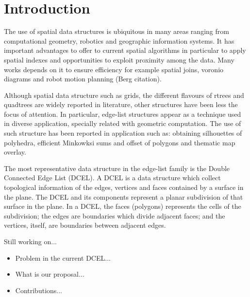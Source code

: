 \section{Introduction}
The use of spatial data structures is ubiquitous in many areas ranging from computational geometry, robotics and geographic information systems.  It has important advantages to offer to current spatial algorithms in particular to apply spatial indexes and opportunities to exploit proximity among the data.  Many works depends on it to ensure efficiency for example spatial joins, voronio diagrams and robot motion planning (Berg citation).

Although spatial data structure such as grids, the different flavours of rtrees and quadtrees are widely reported in literature, other structures have been less the focus of attention.  In particular, edge-list structures appear as a technique used in diverse application, specially related with geometric computation.  The use of such structure has been reported in application such as: obtaining silhouettes of polyhedra, efficient Minkowksi sums and offset of polygons and thematic map overlay. 

The most representative data structure in the edge-list family is the Double Connected Edge List (DCEL).  A DCEL is a data structure which collect topological information of the edges, vertices and faces contained by a surface in the plane.  The DCEL and its components represent a planar subdivision of that surface in the plane. In a DCEL, the faces (polygons) represents the cells of the subdivision; the edges are boundaries which divide adjacent faces; and the vertices, itself, are boundaries between adjacent edges.

\vspace{1cm}
Still working on...
\begin{itemize}
    \item Problem in the current DCEL...
    \item What is our proposal...
    \item Contributions...
\end{itemize}
